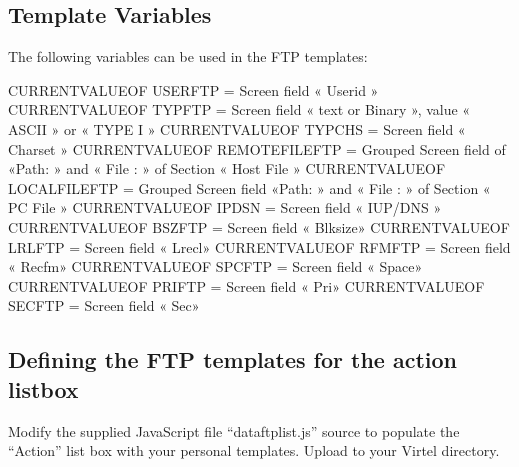 \documentclass[letterpaper,10pt,english]{sphinxmanual}
\begin{document}
\subsection{Template Variables}
\label{\detokenize{Customization:template-variables}}
The following variables can be used in the FTP templates:

\begin{sphinxVerbatim}[commandchars=\\\{\}]
\PYGZob{}\PYGZob{}\PYGZob{}CURRENT\PYGZhy{}VALUE\PYGZhy{}OF \PYGZdq{}USERFTP\PYGZdq{}\PYGZcb{}\PYGZcb{}\PYGZcb{}    = Screen field « Userid »
\PYGZob{}\PYGZob{}\PYGZob{}CURRENT\PYGZhy{}VALUE\PYGZhy{}OF \PYGZdq{}TYPFTP\PYGZdq{}\PYGZcb{}\PYGZcb{}\PYGZcb{}     = Screen field « text or Binary », value « ASCII » or « TYPE I »
\PYGZob{}\PYGZob{}\PYGZob{}CURRENT\PYGZhy{}VALUE\PYGZhy{}OF \PYGZdq{}TYPCHS\PYGZdq{}\PYGZcb{}\PYGZcb{}\PYGZcb{}     = Screen field « Charset »
\PYGZob{}\PYGZob{}\PYGZob{}CURRENT\PYGZhy{}VALUE\PYGZhy{}OF \PYGZdq{}REMOTEFILEFTP\PYGZdq{}\PYGZcb{}\PYGZcb{}\PYGZcb{}      = Grouped Screen field of  «Path: » and « File : » of Section « Host File »
\PYGZob{}\PYGZob{}\PYGZob{}CURRENT\PYGZhy{}VALUE\PYGZhy{}OF \PYGZdq{}LOCALFILEFTP\PYGZdq{}\PYGZcb{}\PYGZcb{}\PYGZcb{}       = Grouped Screen field «Path: » and « File : » of Section « PC File »
\PYGZob{}\PYGZob{}\PYGZob{}CURRENT\PYGZhy{}VALUE\PYGZhy{}OF \PYGZdq{}IPDSN\PYGZdq{}\PYGZcb{}\PYGZcb{}\PYGZcb{}      = Screen field « IUP/DNS »
\PYGZob{}\PYGZob{}\PYGZob{}CURRENT\PYGZhy{}VALUE\PYGZhy{}OF \PYGZdq{}BSZFTP\PYGZdq{}\PYGZcb{}\PYGZcb{}\PYGZcb{}     = Screen field « Blksize»
\PYGZob{}\PYGZob{}\PYGZob{}CURRENT\PYGZhy{}VALUE\PYGZhy{}OF \PYGZdq{}LRLFTP\PYGZdq{}\PYGZcb{}\PYGZcb{}\PYGZcb{}     = Screen field « Lrecl»
\PYGZob{}\PYGZob{}\PYGZob{}CURRENT\PYGZhy{}VALUE\PYGZhy{}OF \PYGZdq{}RFMFTP\PYGZdq{}\PYGZcb{}\PYGZcb{}\PYGZcb{}     = Screen field « Recfm»
\PYGZob{}\PYGZob{}\PYGZob{}CURRENT\PYGZhy{}VALUE\PYGZhy{}OF \PYGZdq{}SPCFTP\PYGZdq{}\PYGZcb{}\PYGZcb{}\PYGZcb{}     = Screen field « Space»
\PYGZob{}\PYGZob{}\PYGZob{}CURRENT\PYGZhy{}VALUE\PYGZhy{}OF \PYGZdq{}PRIFTP\PYGZdq{}\PYGZcb{}\PYGZcb{}\PYGZcb{}     = Screen field « Pri»
\PYGZob{}\PYGZob{}\PYGZob{}CURRENT\PYGZhy{}VALUE\PYGZhy{}OF \PYGZdq{}SECFTP\PYGZdq{}\PYGZcb{}\PYGZcb{}\PYGZcb{}     = Screen field « Sec»
\end{sphinxVerbatim}


\subsection{Defining the FTP templates for the action listbox}
\label{\detokenize{Customization:defining-the-ftp-templates-for-the-action-listbox}}
Modify the supplied JavaScript file “dataftplist.js” source to populate the “Action” list box with your personal templates. Upload to your Virtel directory.
\end{document}
